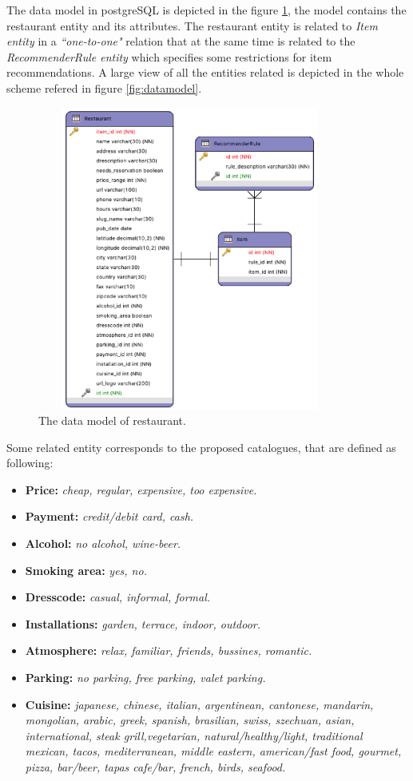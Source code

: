 The data model in postgreSQL is depicted in the figure
\ref{fig:restaurantmodeldata}, the model contains the restaurant
entity and its attributes. The restaurant entity is related to
\textit{Item entity} in a \textit{``one-to-one"} relation that at the
same time is related to the \textit{RecommenderRule entity} which
specifies some restrictions for item recommendations. A large view of
all the entities related is depicted in the whole scheme refered in
figure \ref{fig:datamodel}.
\begin{figure}
\captionsetup{justification=centering,margin=2cm,font=footnotesize}
\centering
\includegraphics[width=10cm,height=10cm,keepaspectratio]{img/data-resmodel.png}
\caption{The data model of restaurant.}
\label{fig:restaurantmodeldata}     
\end{figure}
Some related entity corresponds to the proposed catalogues, 
that are defined as following: 
\begin{itemize}
\item \textbf{Price:} \textit{cheap, regular, expensive, too expensive.}
\item \textbf{Payment:} \textit{credit/debit card, cash.}
\item \textbf{Alcohol:} \textit{no alcohol, wine-beer.}
\item \textbf{Smoking area:} \textit{yes, no.}
\item \textbf{Dresscode:} \textit{casual, informal, formal.}
\item \textbf{Installations:} \textit{garden, terrace, indoor, outdoor.}
\item \textbf{Atmosphere:} \textit{relax, familiar, friends, bussines, romantic.}
\item \textbf{Parking:} \textit{no parking, free parking, valet parking.}
\item \textbf{Cuisine:} \textit{japanese, chinese, italian, argentinean,
cantonese, mandarin, mongolian, arabic, greek, spanish, brasilian,
swiss, szechuan, asian, international, steak grill,vegetarian,
natural/healthy/light, traditional mexican, tacos, mediterranean,
middle eastern, american/fast food, gourmet, pizza, bar/beer, tapas
cafe/bar, french, birds, seafood.}
\end{itemize}
